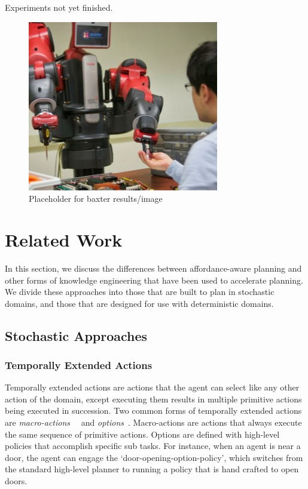 \documentclass[conference]{IEEEtran}
\begin{document}
Experiments not yet finished.

\begin{figure}[H]
\centering
\includegraphics[scale=0.195]{figures/baxter_temp.jpg}%
  \caption{Placeholder for baxter results/image}
  \label{fig:baxter_results}
\end{figure}

\section{Related Work}
\label{sec:related-work}

In this section, we discuss the differences between
affordance-aware planning and other forms of knowledge engineering that
have been used to accelerate planning. We divide these approaches
into those that are built to plan in stochastic domains, and those that are
designed for use with deterministic domains.

\subsection{Stochastic Approaches}

\subsubsection{Temporally Extended Actions}
Temporally extended actions are actions that the agent can
select like any other action of the domain, except executing them
results in multiple primitive actions being executed in
succession. Two common forms of temporally extended actions are {\em
  macro-actions}~\cite{hauskrecht98} ~and {\em options}~\cite{sutton99}. 
Macro-actions are actions that always
execute the same sequence of primitive actions. Options are defined
with high-level policies that accomplish specific sub tasks. For
instance, when an agent is near a door, the agent can engage the
`door-opening-option-policy', which switches from the standard
high-level planner to running a policy that is hand crafted to open
doors. 
\end{document}
